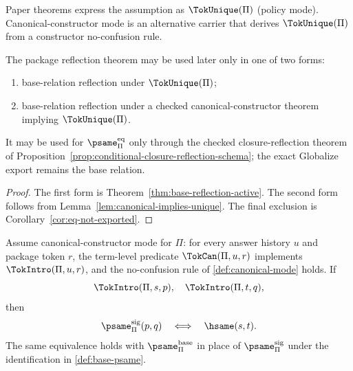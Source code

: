 \begin{principle}
\label{prin:active-token-mode}
Paper theorems express the assumption as \(\TokUnique(\Pi)\) (policy mode). Canonical-constructor mode is an alternative carrier that derives \(\TokUnique(\Pi)\) from a constructor no-confusion rule.
\end{principle}

\begin{corollary}
\label{cor:stable-reflection-contract}
The package reflection theorem may be used later only in one of two forms:
\begin{enumerate}
  \item base-relation reflection under \(\TokUnique(\Pi)\);
  \item base-relation reflection under a checked canonical-constructor theorem implying \(\TokUnique(\Pi)\).
\end{enumerate}
It may be used for \(\psame_{\Pi}^{\mathrm{eq}}\) only through the checked closure-reflection theorem of Proposition~\ref{prop:conditional-closure-reflection-schema}; the exact Globalize export remains the base relation.
\end{corollary}

\begin{proof}
The first form is Theorem~\ref{thm:base-reflection-active}. The second form follows from Lemma~\ref{lem:canonical-implies-unique}. The final exclusion is Corollary~\ref{cor:eq-not-exported}.
\end{proof}

\begin{theorem}
\label{thm:concrete-token-reflection-duality}
Assume canonical-constructor mode for \(\Pi\): for every answer history \(u\) and package token \(r\), the term-level predicate \(\TokCan(\Pi,u,r)\) implements \(\TokIntro(\Pi,u,r)\), and the no-confusion rule of \autoref{def:canonical-mode} holds. If
$$
  \TokIntro(\Pi,s,p),\quad
  \TokIntro(\Pi,t,q),
$$
then
$$
  \psame_{\Pi}^{\mathrm{sig}}(p,q)
  \quad\Longleftrightarrow\quad
  \hsame(s,t).
$$
The same equivalence holds with \(\psame_{\Pi}^{\mathrm{base}}\) in place of \(\psame_{\Pi}^{\mathrm{sig}}\) under the identification in \autoref{def:base-psame}.
\end{theorem}

